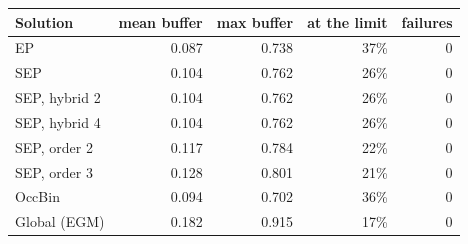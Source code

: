 \begin{tabular}{lrrrr}
\toprule
Solution & mean buffer & max buffer & at the limit & failures \\
\midrule
EP & 0.087 & 0.738 & 37\% & 0 \\
SEP & 0.104 & 0.762 & 26\% & 0 \\
SEP, hybrid 2 & 0.104 & 0.762 & 26\% & 0 \\
SEP, hybrid 4 & 0.104 & 0.762 & 26\% & 0 \\
SEP, order 2 & 0.117 & 0.784 & 22\% & 0 \\
SEP, order 3 & 0.128 & 0.801 & 21\% & 0 \\
OccBin & 0.094 & 0.702 & 36\% & 0 \\
Global (EGM) & 0.182 & 0.915 & 17\% & 0 \\
\bottomrule
\end{tabular}
